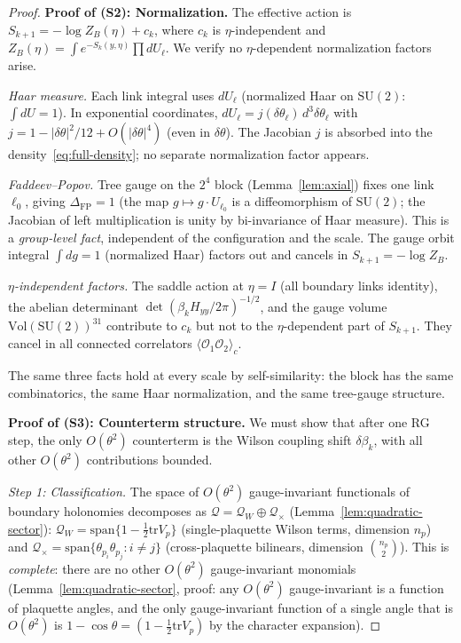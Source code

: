 \documentclass[11pt]{article}
\theoremstyle{definition}
\newcommand{\SU}{\mathrm{SU}}
\newcommand{\tr}{\mathrm{tr}}
\begin{document}
\begin{proof}
\medskip\noindent\textbf{Proof of (S2): Normalization.}
The effective action is $S_{k+1}=-\log Z_B(\eta)+c_k$,
where $c_k$ is $\eta$-independent and
$Z_B(\eta)=\int e^{-S_k(y,\eta)}\prod dU_\ell$.
We verify no $\eta$-dependent normalization factors arise.

\emph{Haar measure.}  Each link integral uses
$dU_\ell$ (normalized Haar on $\SU(2)$: $\int dU=1$).
In exponential coordinates,
$dU_\ell=j(\delta\theta_\ell)\,d^3\delta\theta_\ell$
with $j=1-|\delta\theta|^2/12+O(|\delta\theta|^4)$
(even in $\delta\theta$).  The Jacobian $j$ is absorbed
into the density~\eqref{eq:full-density}; no separate
normalization factor appears.

\emph{Faddeev--Popov.}  Tree gauge on the $2^4$ block
(Lemma~\ref{lem:axial}) fixes one link $\ell_0$, giving
$\Delta_{\mathrm{FP}}=1$ (the map $g\mapsto g\cdot U_{\ell_0}$
is a diffeomorphism of $\SU(2)$; the Jacobian of left
multiplication is unity by bi-invariance of Haar measure).
This is a \emph{group-level fact}, independent of the
configuration and the scale.  The gauge orbit integral
$\int dg=1$ (normalized Haar) factors out and cancels in
$S_{k+1}=-\log Z_B$.

\emph{$\eta$-independent factors.}  The saddle action at
$\eta=I$ (all boundary links identity), the abelian
determinant $\det(\beta_k H_{yy}/2\pi)^{-1/2}$, and the
gauge volume $\mathrm{Vol}(\SU(2))^{31}$ contribute to
$c_k$ but not to the $\eta$-dependent part of $S_{k+1}$.
They cancel in all connected correlators
$\langle\mathcal{O}_1\mathcal{O}_2\rangle_c$.

The same three facts hold at every scale by
self-similarity: the block has the same combinatorics,
the same Haar normalization, and the same tree-gauge structure.

\medskip\noindent\textbf{Proof of (S3): Counterterm structure.}
We must show that after one RG step, the only $O(\theta^2)$
counterterm is the Wilson coupling shift $\delta\beta_k$,
with all other $O(\theta^2)$ contributions bounded.

\emph{Step 1: Classification.}
The space of $O(\theta^2)$ gauge-invariant functionals of
boundary holonomies decomposes as
$\mathcal{Q}=\mathcal{Q}_W\oplus\mathcal{Q}_\times$
(Lemma~\ref{lem:quadratic-sector}):
$\mathcal{Q}_W=\mathrm{span}\{1-\frac{1}{2}\tr V_p\}$
(single-plaquette Wilson terms, dimension $n_p$) and
$\mathcal{Q}_\times=\mathrm{span}\{\theta_{p_i}\theta_{p_j}:
i\ne j\}$ (cross-plaquette bilinears, dimension
$\binom{n_p}{2}$).  This is \emph{complete}: there are no
other $O(\theta^2)$ gauge-invariant monomials
(Lemma~\ref{lem:quadratic-sector}, proof: any $O(\theta^2)$
gauge-invariant is a function of plaquette angles, and the
only gauge-invariant function of a single angle that is
$O(\theta^2)$ is $1-\cos\theta=(1-\frac{1}{2}\tr V_p)$
by the character expansion).


\end{proof}
\end{document}
